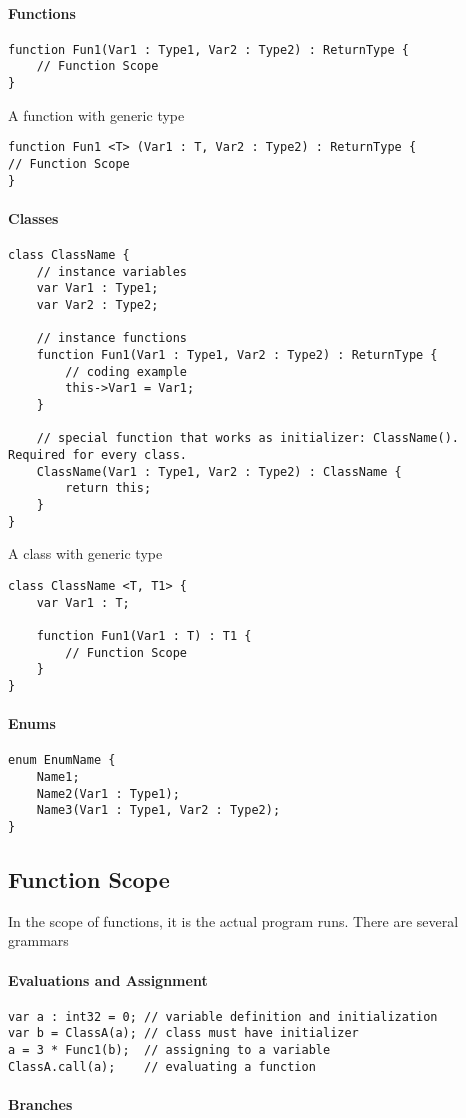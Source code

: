 \documentclass[12pt, a4paper]{IEEEtran}
\begin{document}
\paragraph{Functions}
\begin{lstlisting}
function Fun1(Var1 : Type1, Var2 : Type2) : ReturnType {
	// Function Scope
}
\end{lstlisting}

A function with generic type
\begin{lstlisting}
function Fun1 <T> (Var1 : T, Var2 : Type2) : ReturnType {
// Function Scope
}
\end{lstlisting}
\paragraph{Classes}
\begin{lstlisting}
class ClassName {
	// instance variables
	var Var1 : Type1;
	var Var2 : Type2;
	
	// instance functions
	function Fun1(Var1 : Type1, Var2 : Type2) : ReturnType {
		// coding example
		this->Var1 = Var1;
	}
	
	// special function that works as initializer: ClassName(). Required for every class.
	ClassName(Var1 : Type1, Var2 : Type2) : ClassName {
		return this;
	}
}
\end{lstlisting}

A class with generic type
\begin{lstlisting}
class ClassName <T, T1> {
	var Var1 : T;
	
	function Fun1(Var1 : T) : T1 {
		// Function Scope
	}
}
\end{lstlisting}
\paragraph{Enums}
\begin{lstlisting}
enum EnumName {
	Name1;
	Name2(Var1 : Type1);
	Name3(Var1 : Type1, Var2 : Type2);
}
\end{lstlisting}
\subsection{Function Scope}
In the scope of functions, it is the actual program runs. There are several grammars
\paragraph{Evaluations and Assignment}
\begin{lstlisting}
var a : int32 = 0; // variable definition and initialization
var b = ClassA(a); // class must have initializer
a = 3 * Func1(b);  // assigning to a variable
ClassA.call(a);    // evaluating a function
\end{lstlisting}
\paragraph{Branches}
\end{document}
